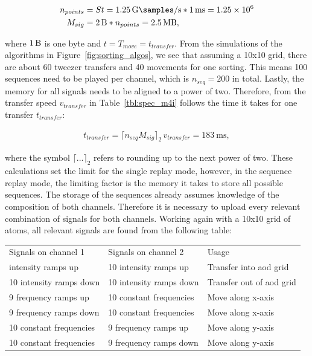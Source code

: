 \begin{align}
	n_{points} &= S t = \SI{1.25}{\giga\samples\per\second} * \SI{1}{\milli\second} = \num{1.25e6} \\
	M_{sig} &= \SI{2}{\byte} * n_{points} = \SI{2.5}{\mega\byte},
\end{align}

where $\SI{1}{\byte}$ is one byte and $t=T_{move}=t_{transfer}$. From the simulations of the algorithms in Figure~\ref{fig:sorting_algos}, we see that assuming a 10x10 grid, there are about 60 tweezer transfers and 40 movements for one sorting. This means 100 sequences need to be played per channel, which is $n_{seq}=200$ in total. Lastly, the memory for all signals needs to be aligned to a power of two. Therefore, from the transfer speed $v_{transfer}$ in Table~\ref{tbl:spec_m4i} follows the time it takes for one transfer $t_{transfer}$:

\begin{align}
	t_{transfer} = \lceil n_{seq} M_{sig}\rceil_2\, v_{transfer} = \SI{183}{\milli\second},
\end{align}

where the symbol $\lceil ... \rceil_2$ refers to rounding up to the next power of two.
These calculations set the limit for the single replay mode, however, in the sequence replay mode, the limiting factor is the memory it takes to store all possible sequences. The storage of the sequences already assumes knowledge of the composition of both channels. Therefore it is necessary to upload every relevant combination of signals for both channels. Working again with a 10x10 grid of atoms, all relevant signals are found from the following table:

\begin{table}[h!]
\label{tbl:eom_crystals}
\centering
\begin{tabular}{l|l|l}
	\hline \hline
		Signals on channel 1 & Signals on channel 2 & Usage \\ \thickhline
		10 intensity ramps up & 10 intensity ramps up & Transfer into \ac{aod} grid \\
		10 intensity ramps down & 10 intensity ramps down & Transfer out of \ac{aod} grid \\
		9 frequency ramps up & 10 constant frequencies & Move along x-axis \\
		9 frequency ramps down & 10 constant frequencies & Move along x-axis \\
		10 constant frequencies & 9 frequency ramps up & Move along y-axis \\
		10 constant frequencies & 9 frequency ramps down & Move along y-axis \\
	\hline \hline
\end{tabular}
\end{table}

